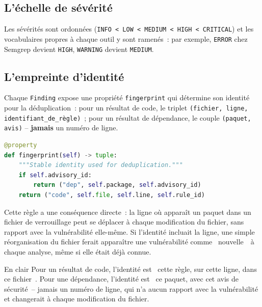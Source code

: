 \documentclass[12pt,a4paper,oneside]{report}
\begin{document}
\subsection{L'\'echelle de s\'ev\'erit\'e}
Les s\'ev\'erit\'es sont ordonn\'ees (\texttt{INFO~<~LOW~<~MEDIUM~<~HIGH~<~CRITICAL}) et les vocabulaires propres \`a chaque outil y sont ramen\'es~: par exemple, \texttt{ERROR} chez Semgrep devient \texttt{HIGH}, \texttt{WARNING} devient \texttt{MEDIUM}.

\subsection{L'empreinte d'identit\'e}
Chaque \texttt{Finding} expose une propri\'et\'e \texttt{fingerprint} qui d\'etermine son identit\'e pour la d\'eduplication~: pour un r\'esultat de code, le triplet \texttt{(fichier, ligne, identifiant\_de\_r\`egle)}~; pour un r\'esultat de d\'ependance, le couple \texttt{(paquet, avis)} -- \textbf{jamais} un num\'ero de ligne.

\begin{lstlisting}[language=Python, caption={L'identit\'e d'un finding lui appartient (\texttt{models.py})}, label={lst:fingerprint}]
@property
def fingerprint(self) -> tuple:
    """Stable identity used for deduplication."""
    if self.advisory_id:
        return ("dep", self.package, self.advisory_id)
    return ("code", self.file, self.line, self.rule_id)
\end{lstlisting}

Cette r\`egle a une cons\'equence directe~: la ligne o\`u appara\^it un paquet dans un fichier de verrouillage peut se d\'eplacer \`a chaque modification du fichier, sans rapport avec la vuln\'erabilit\'e elle-m\^eme. Si l'identit\'e incluait la ligne, une simple r\'eorganisation du fichier ferait appara\^itre une vuln\'erabilit\'e comme \guillemotleft~nouvelle~\guillemotright\ \`a chaque analyse, m\^eme si elle \'etait d\'ej\`a connue.

\begin{infobox}{En clair}
Pour un r\'esultat de code, l'identit\'e est \guillemotleft~cette r\`egle, sur cette ligne, dans ce fichier~\guillemotright. Pour une d\'ependance, l'identit\'e est \guillemotleft~ce paquet, avec cet avis de s\'ecurit\'e~\guillemotright -- jamais un num\'ero de ligne, qui n'a aucun rapport avec la vuln\'erabilit\'e et changerait \`a chaque modification du fichier.
\end{infobox}
\end{document}
